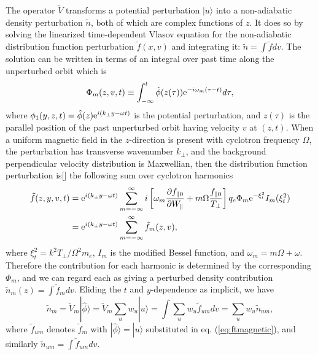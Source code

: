\documentclass[12pt]{article}
\def\ket#1{|#1\rangle}
\begin{document}
The operator $\tilde{V}$ transforms a potential perturbation $\ket{u}$
into a non-adiabatic density perturbation $\tilde n$, both of which
are complex functions of $z$. It does so by solving the linearized
time-dependent Vlasov equation for the non-adiabatic distribution
function perturbation $\tilde f(x,v)$ and integrating it:
$\tilde n =\int \tilde f dv$. The solution can be written in terms of
an integral over past time along the unperturbed orbit which is
\begin{equation}
  \label{eq:phim}
  \Phi_m(z,v,t)\equiv 
  \int_{-\infty}^t \hat\phi(z(\tau)){\rm e}^{-i\omega_m(\tau-t)}d\tau,
\end{equation}
where $\phi_1(y,z,t)=\hat\phi(z){\rm e}^{i(k_\perp y-\omega t)}$ is
the potential perturbation, and $z(\tau)$ is the parallel position of
the past unperturbed orbit having velocity $v$ at $(z,t)$. When a
uniform magnetic field in the $z$-direction is present with cyclotron
frequency $\Omega$, the perturbation has transverse wavenumber
$k_\perp$, and the background perpendicular velocity distribution is
Maxwellian, then the distribution function perturbation is[] the
following sum over cyclotron harmonics
\begin{equation}\label{eq:ftmagnetic}
  \begin{split}
    \tilde f(z,y,v,t) &=  {\rm e}^{i(k_\perp y-\omega t)}
 \sum_{m=-\infty}^\infty i\left[\omega_m
  {\partial f_{\parallel0}\over \partial W_\parallel}
  +m\Omega {f_{\parallel0}\over T_\perp}\right]
  q_e\Phi_m {\rm e}^{-\xi_t^2}I_m(\xi_t^2)\\
  &= {\rm e}^{i(k_\perp y-\omega t)} \sum_{m=-\infty}^\infty \tilde f_m(z,v),
  \end{split}
\end{equation}
where $\xi_t^2=k^2T_\perp/\Omega^2m_e$, $I_m$ is the modified Bessel
function, and $\omega_m=m\Omega+\omega$. Therefore the contribution
for each harmonic is determined by the corresponding $\Phi_m$, and we
can regard each as giving a perturbed density contribution
$\tilde n_m(z)=\int \tilde f_m dv$. Eliding the $t$ and $y$-dependence
as implicit, we have
\begin{equation}
  \label{eq:13}
\tilde  n_m=\tilde{V}_{m}\ket{\hat\phi}=\tilde{V}_{m}\sum_u w_u\ket{u}=\int \sum_u w_u
  \tilde f_{um} dv=\sum_u w_u \tilde n_{um},
\end{equation}
where $\tilde f_{um}$ denotes $\tilde f_m$ with
$\ket{\hat\phi}=\ket{u}$ substituted in eq. (\ref{eq:ftmagnetic}), and
similarly $\tilde n_{um}=\int \tilde f_{um}dv$.
\end{document}
